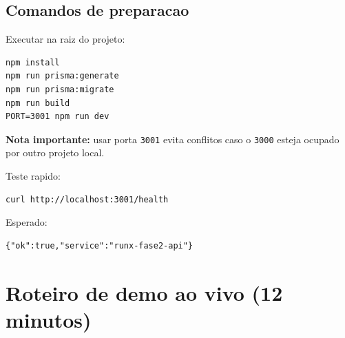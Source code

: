 \documentclass[11pt,a4paper]{article}
\begin{document}
\subsection{Comandos de preparacao}

Executar na raiz do projeto:

\begin{verbatim}
npm install
npm run prisma:generate
npm run prisma:migrate
npm run build
PORT=3001 npm run dev
\end{verbatim}

\textbf{Nota importante:} usar porta \texttt{3001} evita conflitos caso o \texttt{3000} esteja ocupado por outro projeto local.

Teste rapido:

\begin{verbatim}
curl http://localhost:3001/health
\end{verbatim}

Esperado:

\begin{verbatim}
{"ok":true,"service":"runx-fase2-api"}
\end{verbatim}

\section{Roteiro de demo ao vivo (12 minutos)}
\end{document}
